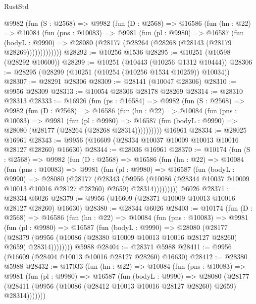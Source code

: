 \begin{lexlean}{RustStd}
\begin{coremodule}
      @9982
        (fun (S : @2568) =>
        @9982
          (fun (D : @2568) =>
          @16586
            (fun (hn : @22) =>
            @10084
              (fun (pns : @10083) =>
              @9981
                (fun (pl : @9980) =>
                @16587
                  (fun (bodyL : @9990) =>
                  @28080 (@28177 (@28264 (@28268 (@28143 (@28179 @28269)))))))))))))
@28292 := @10256 @1536
@28295 := @10251 (@10598 (@28292 @10600))
@28299 := @10251 (@10443 (@10256 @1312 @10444))
@28306 := @28295 (@28299 (@10251 (@10254 (@10256 @1534 @10259)) @10034))
@28307 := @28291 @28306
@28309 := @28141 (@10047 @28306)
@28310 := @9956 @28309
@28313 := @10054 @28306 @28178 @28269
@28314 := @28310 @28313
@28333 := @16926
    (fun (ps : @16584) =>
    @9982
      (fun (S : @2568) =>
      @9982
        (fun (D : @2568) =>
        @16586
          (fun (hn : @22) =>
          @10084
            (fun (pns : @10083) =>
            @9981
              (fun (pl : @9980) =>
              @16587 (fun (bodyL : @9990) => @28080 (@28177 (@28264 (@28268 @28314))))))))))
    @16961
@28334 := @28025 @16961
@28343 := @9956 (@16609 (@28334 @10037 @10009 @10013 @10016 @28127 @28260) @16630)
@28344 := @28036 @16961
@28370 := @10174
    (fun (S : @2568) =>
    @9982
      (fun (D : @2568) =>
      @16586
        (fun (hn : @22) =>
        @10084
          (fun (pns : @10083) =>
          @9981
            (fun (pl : @9980) =>
            @16587
              (fun (bodyL : @9990) =>
              @28080
                (@28177
                  (@28343
                    (@9956
                      (@10086 (@28344 @10037 @10009 @10013 @10016 @28127 @28260) @2659)
                      @28314)))))))))
    @6026
@28371 := @28334 @6026
@28379 := @9956 (@16609 (@28371 @10009 @10013 @10016 @28127 @28260) @16630)
@28380 := @28344 @6026
@28403 := @10174
    (fun (D : @2568) =>
    @16586
      (fun (hn : @22) =>
      @10084
        (fun (pns : @10083) =>
        @9981
          (fun (pl : @9980) =>
          @16587
            (fun (bodyL : @9990) =>
            @28080
              (@28177
                (@28379
                  (@9956 (@10086 (@28380 @10009 @10013 @10016 @28127 @28260) @2659) @28314))))))))
    @5988
@28404 := @28371 @5988
@28411 := @9956 (@16609 (@28404 @10013 @10016 @28127 @28260) @16630)
@28412 := @28380 @5988
@28432 := @17033
    (fun (hn : @22) =>
    @10084
      (fun (pns : @10083) =>
      @9981
        (fun (pl : @9980) =>
        @16587
          (fun (bodyL : @9990) =>
          @28080
            (@28177 (@28411 (@9956 (@10086 (@28412 @10013 @10016 @28127 @28260) @2659) @28314)))))))

\end{coremodule}
\end{lexlean}
